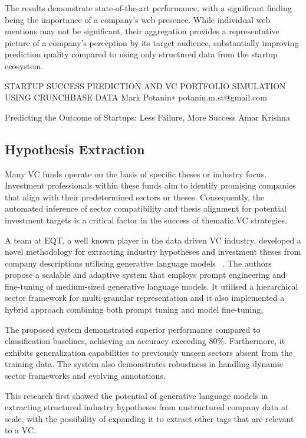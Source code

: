 \documentclass[a4paper, oneside]{discothesis}
\begin{document}
The results demonstrate state-of-the-art performance, with a significant finding being the importance of a company's web presence. While individual web mentions may not be significant, their aggregation provides a representative picture of a company's perception by its target audience, substantially improving prediction quality compared to using only structured data from the startup ecosystem.

STARTUP SUCCESS PREDICTION AND VC PORTFOLIO
SIMULATION USING CRUNCHBASE DATA
Mark Potanin∗
potanin.m.st@gmail.com

Predicting the Outcome of Startups: Less Failure, More Success
Amar Krishna

\subsection{Hypothesis Extraction}

Many VC funds operate on the basis of specific theses or industry focus. Investment professionals within these funds aim to identify promising companies that align with their predetermined sectors or theses. Consequently, the automated inference of sector compatibility and thesis alignment for potential investment targets is a critical factor in the success of thematic VC strategies.


A team at EQT, a well known player in the data driven VC industry, developed a novel methodology for extracting industry hypotheses and investment theses from company descriptions utilising generative language models ~\cite{lele_cao_infer_industry_sector}. The authors propose a scalable and adaptive system that employs prompt engineering and fine-tuning of medium-sized generative language models. It utilised a hierarchical sector framework for multi-granular representation and it also implemented a hybrid approach combining both prompt tuning and model fine-tuning.

The proposed system demonstrated superior performance compared to classification baselines, achieving an accuracy exceeding 80\%. Furthermore, it exhibits generalization capabilities to previously unseen sectors absent from the training data. The system also demonstrates robustness in handling dynamic sector frameworks and evolving annotations.

This research first showed the potential of generative language models in extracting structured industry hypotheses from unstructured company data at scale, with the possibility of expanding it to extract other tags that are relevant to a VC. 
\end{document}
